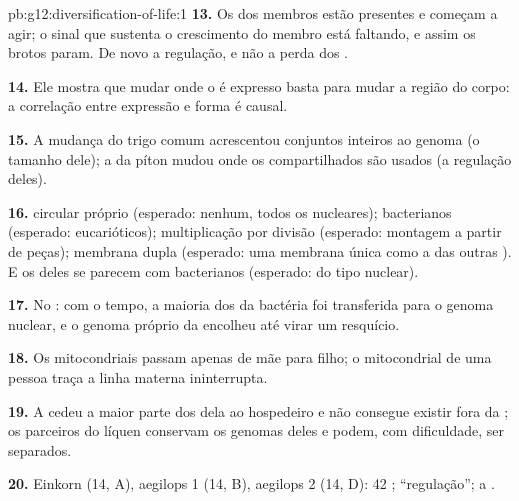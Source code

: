 \begin{solution}{pb:g12:diversification-of-life:1}
\textbf{13.} Os  dos membros estão presentes e começam a agir; o
sinal que sustenta o crescimento do membro está faltando, e assim os
brotos param. De novo a regulação, e não a perda dos .

\textbf{14.} Ele mostra que mudar onde o  é expresso basta para
mudar a região do corpo: a correlação entre expressão e forma é causal.

\textbf{15.} A mudança do trigo comum acrescentou conjuntos inteiros ao
genoma (o tamanho dele); a da píton mudou onde os  compartilhados
são usados (a regulação deles).

\textbf{16.}  circular próprio (esperado: nenhum, todos os 
nucleares);  bacterianos (esperado: 
eucarióticos); multiplicação por divisão (esperado: montagem a partir
de peças); membrana dupla (esperado: uma membrana única como a das
outras ). E os  deles se parecem com  bacterianos
(esperado:  do tipo nuclear).

\textbf{17.} No : com o tempo, a maioria dos  da bactéria
foi transferida para o genoma nuclear, e o genoma próprio da 
encolheu até virar um resquício.

\textbf{18.} Os  mitocondriais passam apenas de mãe para filho; o
 mitocondrial de uma pessoa traça a linha materna ininterrupta.

\textbf{19.} A  cedeu a maior parte dos  dela ao
hospedeiro e não consegue existir fora da ; os parceiros do
líquen conservam os genomas deles e podem, com dificuldade, ser separados.

\textbf{20.} Einkorn (14, A), aegilops 1 (14, B), aegilops 2 (14, D):
42 ; ``regulação''; a .
\end{solution}
